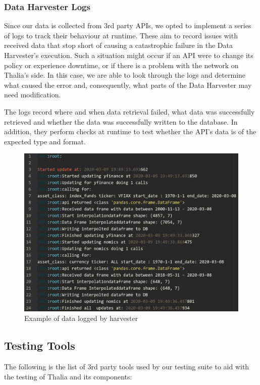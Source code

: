 \documentclass[main.tex]{subfiles}
\begin{document}
\subsubsection{Data Harvester Logs}
Since our data is collected from 3rd party APIs, we opted to implement a series of logs to track their behaviour at runtime. These aim to record issues with received data that stop short of causing a catastrophic failure in the Data Harvester's execution. Such a situation might occur if an API were to change its policy or experience downtime, or if there is a problem with the network on Thalia's side. In this case, we are able to look through the logs and determine what caused the error and, consequently, what parts of the Data Harvester may need modification.

The logs record where and when data retrieval failed, what data was successfully retrieved and whether the data was successfully written to the database. In addition, they perform checks at runtime to test whether the API's data is of the expected type and format.

\begin{figure}[H]
   \centering
   \includegraphics[scale=0.3]{06Testing/06Pictures/harversterLogEx.png}
   \caption{Example of data logged by harvester}
   \label{Example log}
\end{figure}

\subsection{Testing Tools}
The following is the list of 3rd party tools used by our testing suite to aid with the testing of Thalia and its components:
\end{document}
